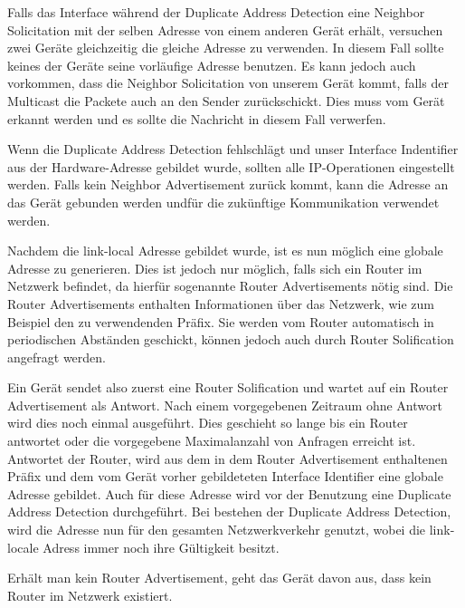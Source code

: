 \documentclass[a4paper, 12pt]{scrartcl}
\begin{document}
Falls das Interface während der Duplicate Address Detection eine Neighbor Solicitation mit der selben Adresse von einem anderen Gerät erhält, versuchen zwei Geräte gleichzeitig die gleiche Adresse zu verwenden. In diesem Fall sollte keines der Geräte seine vorläufige Adresse benutzen. Es kann jedoch auch vorkommen, dass die Neighbor Solicitation von unserem Gerät kommt, falls der Multicast die Packete auch an den Sender zurückschickt.
Dies muss vom Gerät erkannt werden und es sollte die Nachricht in diesem Fall verwerfen.

Wenn die Duplicate Address Detection fehlschlägt und unser Interface Indentifier aus der Hardware-Adresse gebildet wurde, sollten alle IP-Operationen eingestellt werden.
Falls kein Neighbor Advertisement zurück kommt, kann die Adresse an das Gerät gebunden werden undfür die zukünftige Kommunikation verwendet werden.

Nachdem die link-local Adresse gebildet wurde, ist es nun möglich eine globale Adresse zu generieren. Dies ist jedoch nur möglich, falls sich ein Router im Netzwerk befindet, da hierfür sogenannte Router Advertisements nötig sind. Die Router Advertisements enthalten Informationen über das Netzwerk, wie zum Beispiel den zu verwendenden Präfix.
Sie werden vom Router automatisch in periodischen Abständen geschickt, können jedoch auch durch Router Solification angefragt werden.

Ein Gerät sendet also zuerst eine Router Solification und wartet auf ein Router Advertisement als Antwort. Nach einem vorgegebenen Zeitraum ohne Antwort wird dies noch einmal ausgeführt. Dies geschieht so lange bis ein Router antwortet oder die vorgegebene Maximalanzahl von Anfragen erreicht ist. 
Antwortet der Router, wird aus dem in dem Router Advertisement enthaltenen Präfix und dem vom Gerät vorher gebildeteten Interface Identifier eine globale Adresse gebildet.
Auch für diese Adresse wird vor der Benutzung eine Duplicate Address Detection durchgeführt.
Bei bestehen der Duplicate Address Detection, wird die Adresse nun für den gesamten Netzwerkverkehr genutzt, wobei die link-locale Adress immer noch ihre Gültigkeit besitzt.

Erhält man kein Router Advertisement, geht das Gerät davon aus, dass kein Router im Netzwerk existiert.

\newpage
\end{document}
